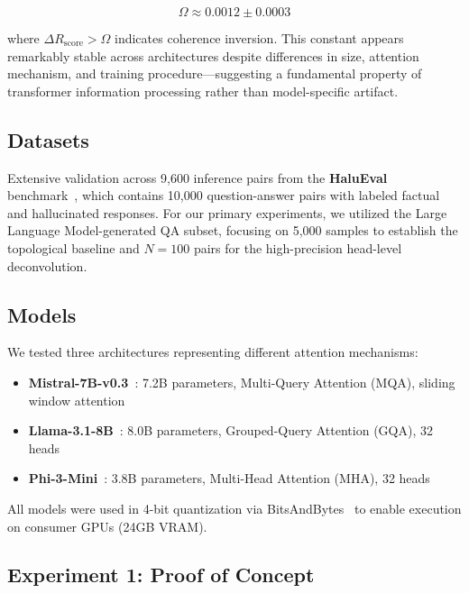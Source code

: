 \documentclass[11pt,twocolumn]{article}
\newcommand{\rscore}{R_{\text{score}}}
\begin{document}
\begin{equation}
\Omega \approx 0.0012 \pm 0.0003
\label{eq:omega}
\end{equation}

where $\Delta \rscore > \Omega$ indicates coherence inversion. This constant appears remarkably stable across architectures despite differences in size, attention mechanism, and training procedure---suggesting a fundamental property of transformer information processing rather than model-specific artifact.

\subsection{Datasets}

Extensive validation across 9,600 inference pairs from the \textbf{HaluEval} benchmark~\cite{li2023halueval}, which contains 10,000 question-answer pairs with labeled factual and hallucinated responses. For our primary experiments, we utilized the Large Language Model-generated QA subset, focusing on 5,000 samples to establish the topological baseline and $N=100$ pairs for the high-precision head-level deconvolution.

\subsection{Models}

We tested three architectures representing different attention mechanisms:

\begin{itemize}
    \item \textbf{Mistral-7B-v0.3}~\cite{jiang2023mistral}: 7.2B parameters, Multi-Query Attention (MQA), sliding window attention
    \item \textbf{Llama-3.1-8B}~\cite{touvron2023llama}: 8.0B parameters, Grouped-Query Attention (GQA), 32 heads
    \item \textbf{Phi-3-Mini}~\cite{abdin2024phi3}: 3.8B parameters, Multi-Head Attention (MHA), 32 heads
\end{itemize}

All models were used in 4-bit quantization via BitsAndBytes~\cite{dettmers2022llmint8} to enable execution on consumer GPUs (24GB VRAM).

\subsection{Experiment 1: Proof of Concept}
\end{document}
